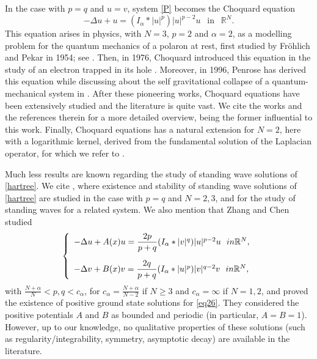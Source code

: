 \documentclass[12pt,a4paper]{article}
\numberwithin{equation}{section}
\begin{document}
In the case with $p=q$ and $u=v$, system \eqref{P} becomes the Choquard equation
\begin{equation}\label{choquardeq}
-\Delta u + u = (I_\alpha \ast |u|^{p})|u|^{p-2}u \ \ \text{ in } \ \ \mathbb{R}^N.
\end{equation}
This equation arises in physics, with $N=3$, $p=2$ and $\alpha=2$, as a modelling problem for the quantum mechanics of a polaron at rest, first studied by Fröhlich and Pekar in 1954; see \cite{Froehlich1954, Froehlich1939, Wilson1955}. Then, in 1976, Choquard introduced this equation in the study of an electron trapped in its hole \cite{Lieb1977}. Moreover, in 1996, Penrose has derived this equation while discussing about the self gravitational collapse of a quantum-mechanical system in  \cite{Penrose1996}. After these pioneering works, Choquard equations have been extensively studied and the literature is quite vast. We cite the works \cite{Moroz2013, Moroz2017} and the references therein for a more detailed overview, being the former influential to this work. Finally, Choquard equations has a natural extension for $N=2$, here with a logarithmic kernel, derived from the fundamental solution of the Laplacian operator, for which we refer to \cite{Cingolani2016}.

Much less results are known regarding the study of standing wave solutions of \eqref{hartree}. We cite \cite{Bhattarai}, where existence and stability of standing wave solutions of \eqref{hartree} are studied in the case with $p=q$ and $N=2,3$, and \cite{Wang-Shi} for the study of standing waves for a related system. We also mention that Zhang and Chen \cite{Chen2023a} studied
\begin{equation}\label{eq26}
\left\{ \begin{array}{ll}
-\Delta u + A(x)u = \dfrac{2p}{p+q}(I_\alpha \ast |v|^{q})|u|^{p-2}u \ \ \textrm{ in } \mathbb{R}^N, \vspace{10pt}\\
-\Delta v + B(x)v = \dfrac{2q}{p+q}(I_\alpha \ast |u|^{p})|v|^{q-2}v \ \ \textrm{ in } \mathbb{R}^N, 
\end{array} \right.
\end{equation}
with $\frac{N+\alpha}{N}<p, q < c_{\alpha}$, for $c_{\alpha}=\frac{N+\alpha}{N-2}$ if $N\geq 3$ and $c_{\alpha}= \infty$ if $N=1,2$, and proved the existence of positive ground state solutions for \eqref{eq26}. They considered the positive potentials $A$ and $B$ as bounded and periodic (in particular, $A = B = 1$). However, up to our knowledge, no qualitative properties of these solutions (such as regularity/integrability, symmetry, asymptotic decay) are available in the literature. 
\end{document}
